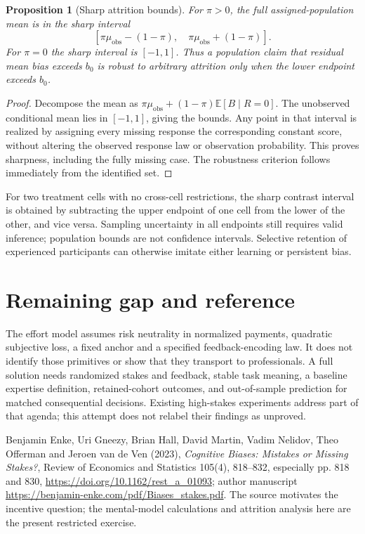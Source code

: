 \documentclass[11pt,a4paper]{article}
\newtheorem{proposition}[theorem]{Proposition}
\theoremstyle{definition}
\theoremstyle{remark}
\newcommand{\E}{\mathbb{E}}
\begin{document}
\begin{proposition}[Sharp attrition bounds]
For $\pi>0$, the full assigned-population mean is in the sharp interval
\[
 [\pi\mu_{\mathrm{obs}}-(1-\pi),\quad
   \pi\mu_{\mathrm{obs}}+(1-\pi)].\tag{3}
\]
For $\pi=0$ the sharp interval is $[-1,1]$. Thus a population claim that residual mean bias exceeds $b_0$ is robust to arbitrary attrition only when the lower endpoint exceeds $b_0$.
\end{proposition}
\begin{proof}
Decompose the mean as $\pi\mu_{\mathrm{obs}}+(1-\pi)\E[B\mid R=0]$. The unobserved conditional mean lies in $[-1,1]$, giving the bounds. Any point in that interval is realized by assigning every missing response the corresponding constant score, without altering the observed response law or observation probability. This proves sharpness, including the fully missing case. The robustness criterion follows immediately from the identified set.
\end{proof}

For two treatment cells with no cross-cell restrictions, the sharp contrast interval is obtained by subtracting the upper endpoint of one cell from the lower of the other, and vice versa. Sampling uncertainty in all endpoints still requires valid inference; population bounds are not confidence intervals. Selective retention of experienced participants can otherwise imitate either learning or persistent bias.

\section{Remaining gap and reference}
The effort model assumes risk neutrality in normalized payments, quadratic subjective loss, a fixed anchor and a specified feedback-encoding law. It does not identify those primitives or show that they transport to professionals. A full solution needs randomized stakes and feedback, stable task meaning, a baseline expertise definition, retained-cohort outcomes, and out-of-sample prediction for matched consequential decisions. Existing high-stakes experiments address part of that agenda; this attempt does not relabel their findings as unproved.

Benjamin Enke, Uri Gneezy, Brian Hall, David Martin, Vadim Nelidov, Theo Offerman and Jeroen van de Ven (2023), \emph{Cognitive Biases: Mistakes or Missing Stakes?}, Review of Economics and Statistics 105(4), 818--832, especially pp. 818 and 830, \url{https://doi.org/10.1162/rest_a_01093}; author manuscript \url{https://benjamin-enke.com/pdf/Biases_stakes.pdf}. The source motivates the incentive question; the mental-model calculations and attrition analysis here are the present restricted exercise.
\end{document}
